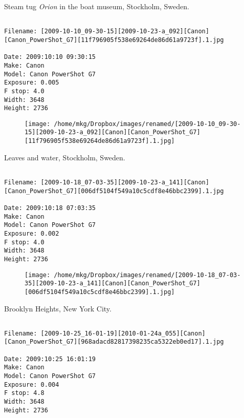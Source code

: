 \clearpage
\onecolumn
\noindent Steam tug \emph{Orion} in the boat museum, Stockholm, Sweden.
\noindent
\begin{lstlisting}

Filename: [2009-10-10_09-30-15][2009-10-23-a_092][Canon][Canon_PowerShot_G7][11f796905f538e69264de86d61a9723f].1.jpg

Date: 2009:10:10 09:30:15
Make: Canon
Model: Canon PowerShot G7
Exposure: 0.005
F stop: 4.0
Width: 3648
Height: 2736
\end{lstlisting}
\clearpage

\begin{figure}
\texttt{[image: /home/mkg/Dropbox/images/renamed/[2009-10-10\_09-30-15][2009-10-23-a\_092][Canon][Canon\_PowerShot\_G7][11f796905f538e69264de86d61a9723f].1.jpg]}
\end{figure}
    
\clearpage
\onecolumn
\noindent Leaves and water, Stockholm, Sweden.
\noindent
\begin{lstlisting}

Filename: [2009-10-18_07-03-35][2009-10-23-a_141][Canon][Canon_PowerShot_G7][006df5104f549a10c5cdf8e46bbc2399].1.jpg

Date: 2009:10:18 07:03:35
Make: Canon
Model: Canon PowerShot G7
Exposure: 0.002
F stop: 4.0
Width: 3648
Height: 2736
\end{lstlisting}
\clearpage

\begin{figure}
\texttt{[image: /home/mkg/Dropbox/images/renamed/[2009-10-18\_07-03-35][2009-10-23-a\_141][Canon][Canon\_PowerShot\_G7][006df5104f549a10c5cdf8e46bbc2399].1.jpg]}
\end{figure}
    
\clearpage
\onecolumn
\noindent Brooklyn Heights, New York City.
\noindent
\begin{lstlisting}

Filename: [2009-10-25_16-01-19][2010-01-24a_055][Canon][Canon_PowerShot_G7][968adacd82817398235ca5322eb0ed17].1.jpg

Date: 2009:10:25 16:01:19
Make: Canon
Model: Canon PowerShot G7
Exposure: 0.004
F stop: 4.8
Width: 3648
Height: 2736
\end{lstlisting}
\clearpage


